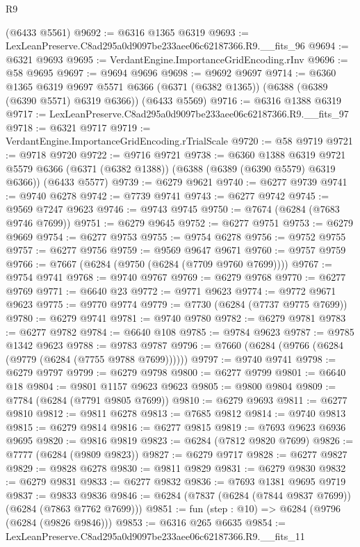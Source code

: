 \begin{lexlean}{R9}
\begin{coremodule}
    (@6433 @5561)
@9692 := @6316 @1365 @6319
@9693 := LexLeanPreserve.C8ad295a0d9097be233aee06c62187366.R9.__fits_96
@9694 := @6321 @9693
@9695 := VerdantEngine.ImportanceGridEncoding.rInv
@9696 := @58 @9695
@9697 := @9694 @9696
@9698 := @9692 @9697
@9714 := @6360
    @1365
    @6319
    @9697
    @5571
    @6366
    (@6371 (@6382 @1365))
    (@6388 (@6389 (@6390 @5571) @6319 @6366))
    (@6433 @5569)
@9716 := @6316 @1388 @6319
@9717 := LexLeanPreserve.C8ad295a0d9097be233aee06c62187366.R9.__fits_97
@9718 := @6321 @9717
@9719 := VerdantEngine.ImportanceGridEncoding.rTrialScale
@9720 := @58 @9719
@9721 := @9718 @9720
@9722 := @9716 @9721
@9738 := @6360
    @1388
    @6319
    @9721
    @5579
    @6366
    (@6371 (@6382 @1388))
    (@6388 (@6389 (@6390 @5579) @6319 @6366))
    (@6433 @5577)
@9739 := @6279 @9621
@9740 := @6277 @9739
@9741 := @9740 @6278
@9742 := @7739 @9741
@9743 := @6277 @9742
@9745 := @9569 @7247 @9623
@9746 := @9743 @9745
@9750 := @7674 (@6284 (@7683 @9746 @7699))
@9751 := @6279 @9645
@9752 := @6277 @9751
@9753 := @6279 @9669
@9754 := @6277 @9753
@9755 := @9754 @6278
@9756 := @9752 @9755
@9757 := @6277 @9756
@9759 := @9569 @9647 @9671
@9760 := @9757 @9759
@9766 := @7667 (@6284 (@9750 (@6284 (@7709 @9760 @7699))))
@9767 := @9754 @9741
@9768 := @9740 @9767
@9769 := @6279 @9768
@9770 := @6277 @9769
@9771 := @6640 @23
@9772 := @9771 @9623
@9774 := @9772 @9671 @9623
@9775 := @9770 @9774
@9779 := @7730 (@6284 (@7737 @9775 @7699))
@9780 := @6279 @9741
@9781 := @9740 @9780
@9782 := @6279 @9781
@9783 := @6277 @9782
@9784 := @6640 @108
@9785 := @9784 @9623
@9787 := @9785 @1342 @9623
@9788 := @9783 @9787
@9796 := @7660 (@6284 (@9766 (@6284 (@9779 (@6284 (@7755 @9788 @7699))))))
@9797 := @9740 @9741
@9798 := @6279 @9797
@9799 := @6279 @9798
@9800 := @6277 @9799
@9801 := @6640 @18
@9804 := @9801 @1157 @9623 @9623
@9805 := @9800 @9804
@9809 := @7784 (@6284 (@7791 @9805 @7699))
@9810 := @6279 @9693
@9811 := @6277 @9810
@9812 := @9811 @6278
@9813 := @7685 @9812
@9814 := @9740 @9813
@9815 := @6279 @9814
@9816 := @6277 @9815
@9819 := @7693 @9623 @6936 @9695
@9820 := @9816 @9819
@9823 := @6284 (@7812 @9820 @7699)
@9826 := @7777 (@6284 (@9809 @9823))
@9827 := @6279 @9717
@9828 := @6277 @9827
@9829 := @9828 @6278
@9830 := @9811 @9829
@9831 := @6279 @9830
@9832 := @6279 @9831
@9833 := @6277 @9832
@9836 := @7693 @1381 @9695 @9719
@9837 := @9833 @9836
@9846 := @6284 (@7837 (@6284 (@7844 @9837 @7699)) (@6284 (@7863 @7762 @7699)))
@9851 := fun (step : @10) => @6284 (@9796 (@6284 (@9826 @9846)))
@9853 := @6316 @265 @6635
@9854 := LexLeanPreserve.C8ad295a0d9097be233aee06c62187366.R9.__fits_11

\end{coremodule}
\end{lexlean}
